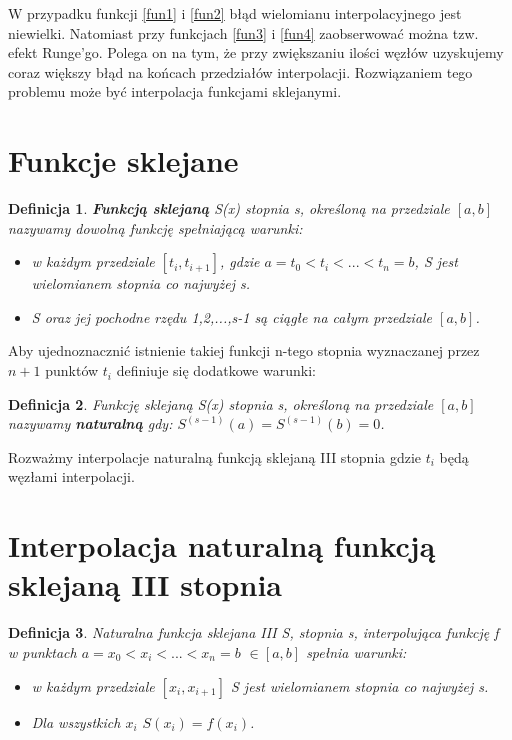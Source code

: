 \documentclass{article}
\newtheorem{defi}{Definicja}
\begin{document}
W przypadku funkcji \eqref{fun1} i \eqref{fun2} błąd wielomianu interpolacyjnego jest niewielki. Natomiast przy funkcjach \eqref{fun3} i \eqref{fun4} zaobserwować można tzw. efekt Runge'go\cite{runge}. Polega on na tym, że przy zwiększaniu ilości węzłów uzyskujemy coraz większy błąd na końcach przedziałów interpolacji. Rozwiązaniem tego problemu może być interpolacja funkcjami sklejanymi.


\section{Funkcje sklejane}


\begin{defi}
	\textbf{Funkcją sklejaną} S(x) stopnia s, określoną na przedziale $[a,b]$ nazywamy dowolną funkcję spełniającą warunki:
	
	\begin{itemize}
		\item w każdym przedziale $[t_i,t_{i+1}]$, gdzie $a = t_0 < t_i <...<t_n = b$, S jest wielomianem stopnia co najwyżej s.
		\item S oraz jej pochodne rzędu 1,2,...,s-1 są ciągłe na całym przedziale $[a,b]$.
	\end{itemize}
\end{defi}

\noindent Aby ujednoznacznić istnienie takiej funkcji n-tego stopnia wyznaczanej przez $n+1$ punktów $t_i$ definiuje się dodatkowe warunki:

\begin{defi}
	Funkcję sklejaną S(x) stopnia s, określoną na przedziale $[a,b]$
	nazywamy \textbf{naturalną} gdy:
	$S^{(s-1)}(a) = S^{(s-1)}(b) = 0$.
\end{defi}

Rozważmy interpolacje naturalną funkcją sklejaną III stopnia gdzie $t_i$ będą węzłami interpolacji.

\section{Interpolacja naturalną funkcją sklejaną III stopnia}

\begin{defi}
	Naturalna funkcja sklejana III S, stopnia s, interpolująca funkcję f w punktach $a = x_0 < x_i <...<x_n = b$ $\in [a,b]$ spełnia warunki:
	
	\begin{itemize}
		\item w każdym przedziale $[x_i,x_{i+1}]$ S jest wielomianem stopnia co najwyżej s.
		\item Dla wszystkich $x_i$ $S(x_i) = f(x_i)$.
	\end{itemize}
	
\end{defi}
\end{document}
